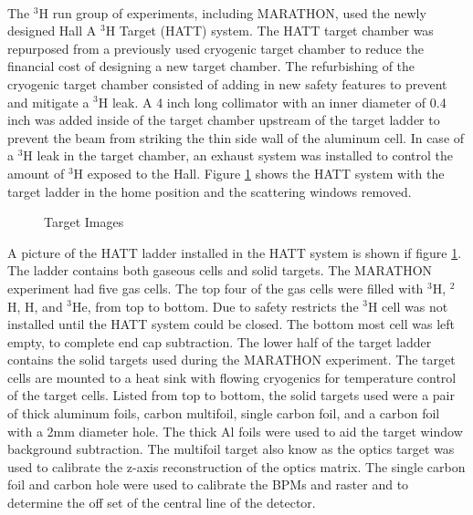 \paragraph{} The $^3$H run group of experiments, including MARATHON, used the newly designed Hall A $^3$H Target (HATT) system. The HATT target chamber was repurposed from a previously used cryogenic target chamber to reduce the financial cost of designing a new target chamber. The refurbishing of the cryogenic target chamber consisted of adding in new safety features to prevent and mitigate a $^3$H leak.  A 4 inch long collimator with an inner diameter of 0.4 inch was added inside of the target chamber upstream of the target ladder to prevent the beam from striking the thin side wall of the aluminum cell. In case of a $^3$H leak in the target chamber, an exhaust system was installed to control the amount of $^3$H exposed to the Hall.\cite{HATT_eng}  Figure \ref{HATT} shows the HATT system with the target ladder in the home position and the scattering windows removed. 
\begin{figure}[t]
	\centering
	
	\hspace*{-20pt}
	\centering
	\caption{Target Images}
	\label{HATT}


\end{figure}
A picture of the HATT ladder installed in the HATT system is shown if figure \ref{HATT}. The ladder contains both gaseous cells and solid targets. The MARATHON experiment had five gas cells. The top four of the gas cells were filled with $^3$H, $^2$H, H, and $^3$He, from top to bottom. Due to safety restricts the $^3$H cell was not installed until the HATT system could be closed. The bottom most cell was left empty, to complete end cap subtraction. The lower half of the target ladder contains the solid targets used during the MARATHON experiment. The target cells are mounted to a heat sink with flowing cryogenics for temperature control of the target cells. Listed from top to bottom, the solid targets used were a pair of thick aluminum foils, carbon multifoil, single carbon foil, and a carbon foil with a 2mm diameter hole. The thick Al foils were used to aid the target window background subtraction. The multifoil target also know as the optics target was used to calibrate the z-axis  reconstruction of the optics matrix. The single carbon foil and carbon hole were used to calibrate the BPMs and raster and to determine the off set of the central line of the detector. 

